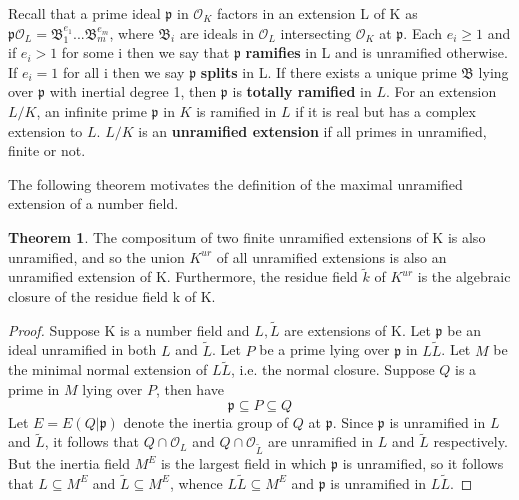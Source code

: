\documentclass[12pt]{extarticle}
\newcommand{\<}{\langle}
\renewcommand{\>}{\rangle}
\theoremstyle{definition}
\newtheorem{theorem}{Theorem}
\begin{document}
Recall that a prime ideal $\mathfrak{p}$ in $\mathcal{O}_K$ factors in an extension L of K as
$\mathfrak{p}\mathcal{O}_L=\mathfrak{B}_1^{e_1}...\mathfrak{B}_m^{e_m}$, where $\mathfrak{B}_i$ are ideals in $\mathcal{O}_L$ intersecting $\mathcal{O}_K$ at $\mathfrak{p}$. Each $e_i\geq1$ and if $e_i>1$ for some i then we say that $\mathfrak{p}$ \textbf{ramifies} in L and is unramified otherwise. If $e_i=1$ for all i then we say $\mathfrak{p}$ \textbf{splits} in L. If there exists a unique prime $\mathfrak{B}$ lying over $\mathfrak{p}$ with inertial degree 1, then $\mathfrak{p}$ is \textbf{totally ramified} in $L$. For an extension $L/K$, an infinite prime $\mathfrak{p}$ in $K$ is ramified in $L$ if it is real but has a complex extension to $L$. $L/K$ is an \textbf{unramified extension} if all primes in unramified, finite or not. 
\par
The following theorem  motivates the definition of the maximal unramified extension of a number field. 
\begin{theorem}
The compositum of two finite unramified extensions of K is also unramified, and so the union $K^{ur}$ of all unramified extensions is also an unramified extension of K. Furthermore, the residue field $\tilde{k}$ of $K^{ur}$ is the algebraic closure of the residue field k of K.
\end{theorem}
\begin{proof}
    Suppose K is a number field and $L,\tilde{L}$ are extensions of K. Let $\mathfrak{p}$ be an ideal unramified in both $L$ and $\tilde{L}$. Let $P$ be a prime lying over $\mathfrak{p}$ in $L\tilde{L}$. Let $M$ be the minimal normal extension of $L\tilde{L}$, i.e. the normal closure. Suppose $Q$ is a prime in $M$ lying over $P$, then have 
    \begin{equation}
        \mathfrak{p}\subseteq P \subseteq Q
    \end{equation}
    Let $E=E(Q|\mathfrak{p})$ denote the inertia group of $Q$ at $\mathfrak{p}$. 
    Since $\mathfrak{p}$ is unramified in $L$ and $\tilde{L}$, it follows that $Q \cap \mathcal{O}_L$ and $Q \cap \mathcal{O}_{\tilde{L}}$ are unramified in $L$ and $\tilde{L}$ respectively. 
 But the inertia field $M^E$ is the largest field in which $\mathfrak{p}$ is unramified, so it follows that $L\subseteq M^E$ and $\tilde{L} \subseteq M^E $, whence $L\tilde{L}\subseteq M^E$ and $\mathfrak{p}$ is unramified in $L\tilde{L}$.
\end{proof}
\end{document}

